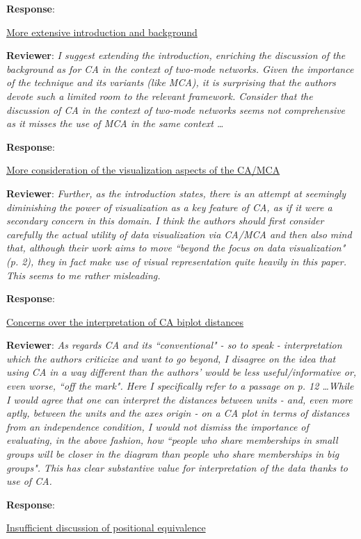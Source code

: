 \documentclass{article}
\begin{document}
\textbf{Response}:

\underline{More extensive introduction and background}

\textbf{Reviewer}: \textit{I suggest extending the introduction, enriching the discussion of the background as for CA in the context of two-mode networks. Given the importance of the technique and its variants (like MCA), it is surprising that the authors devote such a limited room to the relevant framework. Consider that the discussion of CA in the context of two-mode networks seems not comprehensive as it misses the use of MCA in the same context \ldots}

\textbf{Response}:

\underline{More consideration of the visualization aspects of the CA/MCA}

\textbf{Reviewer}: \textit{Further, as the introduction states, there is an attempt at seemingly diminishing the power of visualization as a key feature of CA, as if it were a secondary concern in this domain. I think the authors should first consider carefully the actual utility of data visualization via CA/MCA and then also mind that, although their work aims to move ``beyond the focus on data visualization" (p. 2), they in fact make use of visual representation quite heavily in this paper. This seems to me rather misleading.} 

\textbf{Response}:

\underline{Concerns over the interpretation of CA biplot distances}

\textbf{Reviewer}: \textit{As regards CA and its ``conventional" - so to speak - interpretation which the authors criticize and want to go beyond, I disagree on the idea that using CA in a way different than the authors' would be less useful/informative or, even worse, ``off the mark". Here I specifically refer to a passage on p. 12 \ldots While I would agree that one can interpret the distances between units - and, even more aptly, between the units and the axes origin - on a CA plot in terms of distances from an independence condition, I would not dismiss the importance of evaluating, in the above fashion, how ``people who share memberships in small groups will be closer in the diagram than people who share memberships in big groups". This has clear substantive value for interpretation of the data thanks to use of CA.}

\textbf{Response}:

\underline{Insufficient discussion of positional equivalence}
\end{document}
